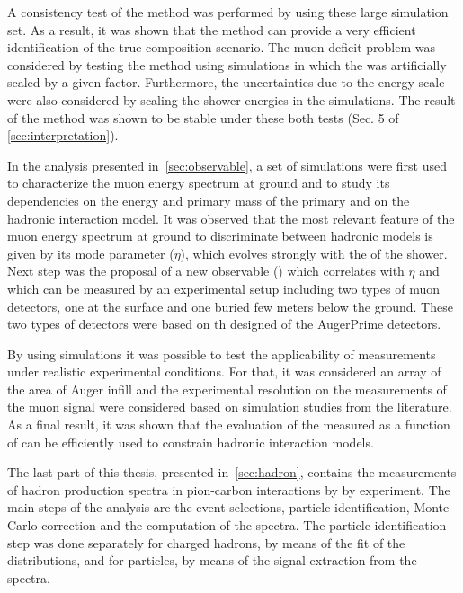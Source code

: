 A consistency test of the method was performed by using these large simulation set.
As a result, it was shown that the method can provide a very efficient identification
of the true composition scenario. The muon deficit problem was considered by testing
the method using simulations in which the \nmu was artificially scaled by a given
factor. Furthermore, the uncertainties due to the energy scale were also considered
by scaling the shower energies in the simulations. The result of the method was shown
to be stable under these both tests (Sec. 5 of \cref{sec:interpretation}). \newline

In the analysis presented in~\cref{sec:observable}, a set of \Corsika simulations
were first used to characterize the muon energy spectrum at ground and to study
its dependencies on the energy and primary mass of the primary and on the hadronic
interaction model. It was observed that the most relevant feature of
the muon energy spectrum at ground to discriminate between hadronic models
is given by its mode parameter ($\eta$), which evolves strongly with the \dx of the shower.
Next step was the proposal of a new observable (\rmu) which correlates with $\eta$ and which
can be measured by an experimental setup including two types of muon detectors,
one at the surface and one buried few meters below the ground. These two types of detectors
were based on th designed of the AugerPrime detectors.

By using \Corsika simulations it was possible to test the applicability of \rmu measurements
under realistic experimental conditions. For that, it was considered an array of the area
of Auger infill and the experimental resolution on the measurements of the muon signal
were considered based on simulation studies from the literature.
As a final result, it was shown that the evaluation of the measured \rmumean as a function of \dx
can be efficiently used to constrain hadronic interaction models. \newline


The last part of this thesis, presented in~\cref{sec:hadron},
contains the measurements of hadron production spectra in pion-carbon
interactions by by \NASixtyOne experiment. The main steps of the analysis
are the event selections, particle identification, Monte Carlo correction and
the computation of the spectra. The particle identification step was done separately
for charged hadrons, by means of the fit of the \dedx distributions, and for
\vzero particles, by means of the signal extraction from the \minv spectra.

